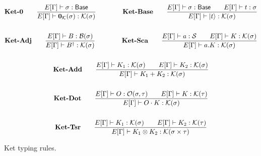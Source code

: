 \documentclass{article}
\begin{document}
\begin{figure}[h]
    \begin{gather*}
        \textbf{Ket-0} \qquad
        \frac{E[\Gamma] \vdash \sigma : \mathsf{Base}}{E[\Gamma] \vdash \mathbf{0}_\mathcal{K}(\sigma) : \mathcal{K}(\sigma)} 
        \qquad \qquad
        \textbf{Ket-Base} \qquad
        \frac{E[\Gamma] \vdash \sigma : \mathsf{Base} \qquad E[\Gamma]\vdash t : \sigma}{E[\Gamma] \vdash \ket{t} : \mathcal{K}(\sigma)} \\
        \\
        \textbf{Ket-Adj} \qquad
        \frac{E[\Gamma] \vdash B : \mathcal{B}(\sigma)}{E[\Gamma] \vdash B^\dagger : \mathcal{K}(\sigma)} 
        \qquad \qquad
        \textbf{Ket-Sca} \qquad
        \frac{E[\Gamma] \vdash a : \mathcal{S} \qquad E[\Gamma] \vdash K : \mathcal{K}(\sigma)}{E[\Gamma] \vdash a.K : \mathcal{K}(\sigma)} \\
        \\
        \textbf{Ket-Add} \qquad
        \frac{E[\Gamma] \vdash K_1 : \mathcal{K}(\sigma) \qquad E[\Gamma] \vdash K_2 : \mathcal{K}(\sigma)}{E[\Gamma] \vdash K_1 + K_2 : \mathcal{K}(\sigma)} \\
        \\
        \textbf{Ket-Dot} \qquad
        \frac{E[\Gamma] \vdash O : \mathcal{O}(\sigma, \tau) \qquad E[\Gamma] \vdash K : \mathcal{K}(\tau)}{E[\Gamma] \vdash O \cdot K : \mathcal{K}(\sigma)} \\
        \\
        \textbf{Ket-Tsr} \qquad
        \frac{E[\Gamma] \vdash K_1 : \mathcal{K}(\sigma) \qquad E[\Gamma] \vdash K_2 : \mathcal{K}(\tau)} {E[\Gamma] \vdash K_1 \otimes K_2 : \mathcal{K}(\sigma \times \tau)}
    \end{gather*}
    \caption{Ket typing rules.}
\end{figure}
\end{document}
